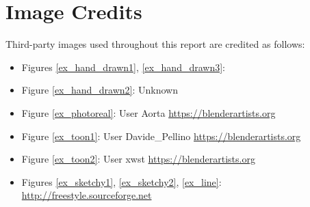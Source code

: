 \chapter{Image Credits}\label{appendix_credits}

Third-party images used throughout this report are credited as follows:

\begin{itemize}
	\item{Figures \ref{ex_hand_drawn1}, \ref{ex_hand_drawn3}: \cite{francis2007}}
	\item{Figure \ref{ex_hand_drawn2}: Unknown}
	\item{Figure \ref{ex_photoreal}: User Aorta \url{https://blenderartists.org}}
	\item{Figure \ref{ex_toon1}: User Davide\_Pellino \url{https://blenderartists.org}}
	\item{Figure \ref{ex_toon2}: User xwst \url{https://blenderartists.org}}
	\item{Figures \ref{ex_sketchy1}, \ref{ex_sketchy2}, \ref{ex_line}: \url{http://freestyle.sourceforge.net}}
\end{itemize}